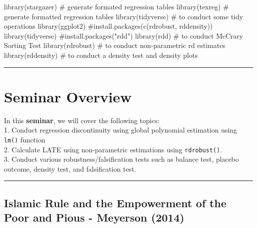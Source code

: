 \documentclass[
  letterpaper,
  DIV=11,
  numbers=noendperiod]{scrreprt}
\newenvironment{Shaded}{\begin{snugshade}}{\end{snugshade}}
\newcommand{\CommentTok}[1]{\textcolor[rgb]{0.37,0.37,0.37}{#1}}
\newcommand{\FunctionTok}[1]{\textcolor[rgb]{0.28,0.35,0.67}{#1}}
\newcommand{\NormalTok}[1]{\textcolor[rgb]{0.00,0.23,0.31}{#1}}
\begin{document}
\begin{Shaded}
\begin{Highlighting}[]
\FunctionTok{library}\NormalTok{(stargazer) }\CommentTok{\# generate formated regression tables }
\FunctionTok{library}\NormalTok{(texreg) }\CommentTok{\# generate formatted regression tables}
\FunctionTok{library}\NormalTok{(tidyverse) }\CommentTok{\# to conduct some tidy operations}
\FunctionTok{library}\NormalTok{(ggplot2)}
\CommentTok{\#install.packages(c(rdrobust, rddensity))}
\FunctionTok{library}\NormalTok{(tidyverse)}
\CommentTok{\#install.packages("rdd")}
\FunctionTok{library}\NormalTok{(rdd) }\CommentTok{\# to conduct McCrary Sorting Test }
\FunctionTok{library}\NormalTok{(rdrobust) }\CommentTok{\# to conduct non{-}parametric rd estimates }
\FunctionTok{library}\NormalTok{(rddensity) }\CommentTok{\# to conduct a density test and density plots}
\end{Highlighting}
\end{Shaded}

\begin{center}\rule{0.5\linewidth}{0.5pt}\end{center}

\hypertarget{seminar-overview}{%
\chapter{Seminar Overview}\label{seminar-overview}}

In this \textbf{seminar}, we will cover the following topics:\\
1. Conduct regression discontinuity using global polynomial estimation
using \texttt{lm()} function\\
2. Calculate LATE using non-parametric estimations using
\texttt{rdrobust()}.\\
3. Conduct various robustness/falsification tests such as balance test,
placebo outcome, density test, and falsification test.

\begin{center}\rule{0.5\linewidth}{0.5pt}\end{center}

\hypertarget{islamic-rule-and-the-empowerment-of-the-poor-and-pious---meyerson-2014}{%
\section{Islamic Rule and the Empowerment of the Poor and Pious -
Meyerson
(2014)}\label{islamic-rule-and-the-empowerment-of-the-poor-and-pious---meyerson-2014}}
\end{document}
